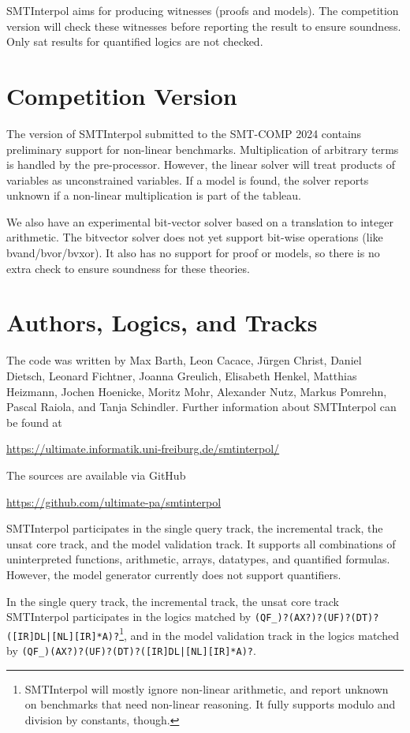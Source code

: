\documentclass[a4paper]{easychair}
\newcommand\SI{SMTInterpol\xspace}
\begin{document}
\SI aims for producing witnesses (proofs and models).  The competition version will check these witnesses before reporting the result to ensure soundness.  Only sat results for quantified logics are not checked.

\section*{Competition Version}
The version of \SI submitted to the SMT-COMP 2024 contains
preliminary support for non-linear benchmarks.  Multiplication of arbitrary terms is handled by the pre-processor.  However, the linear solver will treat products of variables as unconstrained variables.  If a model is found, the solver reports unknown if a non-linear multiplication is part of the tableau.

We also have an experimental bit-vector solver based on a translation to integer arithmetic.  The bitvector solver does not yet support bit-wise operations (like bvand/bvor/bvxor). It also has no support for proof or models, so there is no extra check to ensure soundness for these theories.

\section*{Authors, Logics, and Tracks}
The code was written by Max Barth, Leon Cacace, J{\"u}rgen Christ, Daniel Dietsch, Leonard Fichtner, Joanna Greulich, Elisabeth Henkel, Matthias Heizmann, Jochen Hoenicke, Moritz Mohr, Alexander Nutz, Markus Pomrehn, Pascal Raiola, and Tanja Schindler.
Further information about \SI can be found at
\begin{center}
  \url{https://ultimate.informatik.uni-freiburg.de/smtinterpol/}
\end{center}
The sources are available via GitHub
\begin{center}
  \url{https://github.com/ultimate-pa/smtinterpol}
\end{center}

\SI participates in the single query track, the incremental track, the unsat core track, and the model validation track.
It supports all combinations of uninterpreted functions, arithmetic, arrays, datatypes, and quantified formulas.
However, the model generator currently does not support quantifiers.

In the single query track, the incremental track, the unsat core track \SI participates in the logics matched by
\verb!(QF_)?(AX?)?(UF)?(DT)?([IR]DL|[NL][IR]*A)?!\footnote{\SI will mostly ignore non-linear arithmetic, and report unknown on benchmarks that need non-linear reasoning.  It fully supports modulo and division by constants, though.},
and in the model validation track in the logics matched by
\verb!(QF_)(AX?)?(UF)?(DT)?([IR]DL|[NL][IR]*A)?!.



\end{document}
